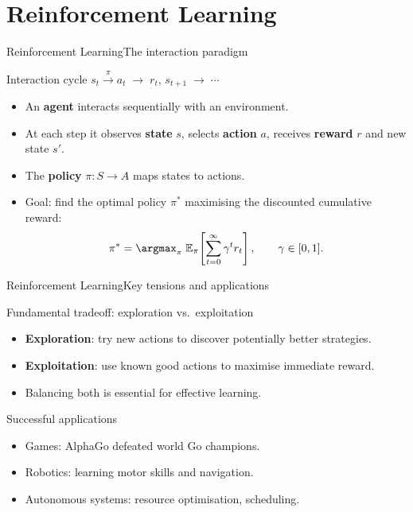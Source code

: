 \section{Reinforcement Learning}

\begin{frame}{Reinforcement Learning}{The interaction paradigm}
  \begin{block}{Interaction cycle}
    \centering
    $s_t \xrightarrow{\;\pi\;} a_t \;\longrightarrow\; r_t,\, s_{t+1} \;\longrightarrow\; \cdots$
  \end{block}
  \begin{itemize}
    \item An \textcolor{AccentBlue}{\textbf{agent}} interacts sequentially with an
          environment.
    \item At each step it observes \textcolor{AccentBlue}{\textbf{state}} $s$, selects
          \textcolor{AccentBlue}{\textbf{action}} $a$, receives
          \textcolor{AccentBlue}{\textbf{reward}} $r$ and new state $s'$.
    \item The \textcolor{AccentBlue}{\textbf{policy}} $\pi: S \to A$ maps states to actions.
    \item Goal: find the optimal policy $\pi^*$ maximising the discounted cumulative reward:
      \[
        \pi^* = \argmax_{\pi}\; \mathbb{E}_{\pi}\!\left[\sum_{t=0}^{\infty} \gamma^t r_t\right],
        \qquad \gamma \in [0,1].
      \]
  \end{itemize}
\end{frame}

\begin{frame}{Reinforcement Learning}{Key tensions and applications}
  \begin{alertblock}{Fundamental tradeoff: exploration vs.\ exploitation}
    \begin{itemize}
      \item \textbf{Exploration}: try new actions to discover potentially better strategies.
      \item \textbf{Exploitation}: use known good actions to maximise immediate reward.
      \item Balancing both is essential for effective learning.
    \end{itemize}
  \end{alertblock}
  \bigskip
  \begin{block}{Successful applications}
    \begin{itemize}
      \item Games: AlphaGo defeated world Go champions.
      \item Robotics: learning motor skills and navigation.
      \item Autonomous systems: resource optimisation, scheduling.
    \end{itemize}
  \end{block}
\end{frame}

